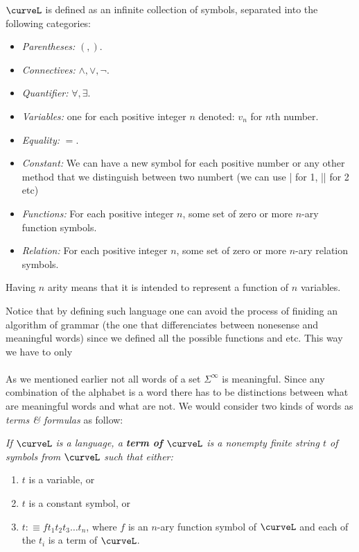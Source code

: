 
 $\curveL$ is defined as an infinite collection of symbols, separated into the following categories:
\begin{itemize}
    \item \textit{Parentheses:} $(,)$.
    \item \textit{Connectives:} $\land, \lor, \neg$.
    \item \textit{Quantifier:} $\forall, \exists$.
    \item \textit{Variables:} one for each positive integer $n$ denoted: $v_n$ for $n$th number.
    \item \textit{Equality:} $=$.
    \item \textit{Constant:} We can have a new symbol for each positive number or any other method that we distinguish between two numbert (we can use | for 1, || for 2 etc)
    \item \textit{Functions:} For each positive integer $n$, some set of zero or more $n$-ary function symbols.
    \item \textit{Relation:} For each positive integer $n$, some set of zero or more $n$-ary relation symbols.
\end{itemize}
\begin{callout}
    Having $n$ arity means that it is intended to represent a function of $n$ variables.
\end{callout}
Notice that by defining such language one can avoid the process of finiding an algorithm of grammar (the one that differenciates between nonesense and meaningful words) since we defined all the possible functions and etc. This way we have to only
\\
\\
 As we mentioned earlier not all words of a set $\Sigma^\infty$ is meaningful. Since any combination of the alphabet is a word there has to be distinctions between what are meaningful words and what are not. We would consider two kinds of words as \textit{terms \& formulas} as follow:
\begin{define}
    \textit{If $\curveL$ is a language, a \textbf{term of $\curveL$} is a nonempty finite string $t$ of symbols from $\curveL$ such that either:}
    \begin{enumerate}
        \item $t$ is a variable, or
        \item $t$ is a constant symbol, or 
        \item $t:\equiv ft_1t_2t_3\dots t_n$, where $f$ is an $n$-ary function symbol of $\curveL$ and each of the $t_i$ is a term of $\curveL$.
    \end{enumerate}
\end{define}